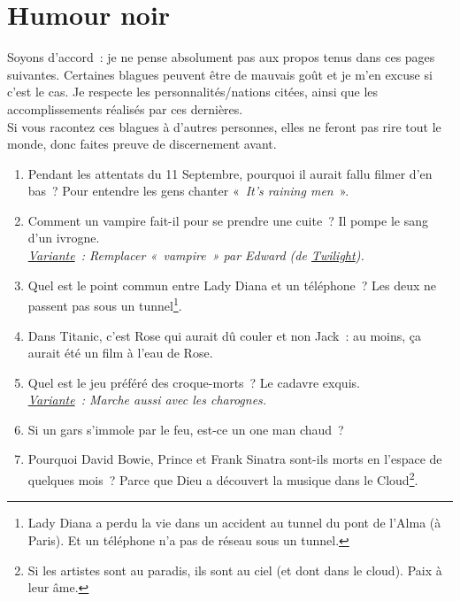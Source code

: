\documentclass[10pt,a5paper,fullpage]{book}
\begin{document}
\chapter{Humour noir}
Soyons d'accord~: je ne pense absolument pas aux propos tenus dans ces pages suivantes. Certaines blagues peuvent être de mauvais goût et je m'en excuse si c'est le cas. Je respecte les personnalités/nations citées, ainsi que les accomplissements réalisés par ces dernières. \\ 
Si vous racontez ces blagues à d'autres personnes, elles ne feront pas rire tout le monde, donc faites preuve de discernement avant. 
\newpage
\begin{enumerate}
	\item Pendant les attentats du 11 Septembre, pourquoi il aurait fallu filmer d’en bas~? Pour entendre les gens chanter «~\textit{It’s raining men}~».
	
	\item Comment un vampire fait-il pour se prendre une cuite~? Il pompe le sang d’un ivrogne. 
	\\\textit{\underline{Variante}~: Remplacer «~vampire~» par Edward (de \underline{Twilight}).}
	
	\item Quel est le point commun entre Lady Diana et un téléphone~? Les deux ne passent pas sous un tunnel\footnote{Lady Diana a perdu la vie dans un accident au tunnel du pont de l'Alma (à Paris). Et un téléphone n'a pas de réseau sous un tunnel.}.
	
	\item Dans Titanic, c’est Rose qui aurait dû couler et non Jack~: au moins, ça aurait été un film à l’eau de Rose.
	
	\item Quel est le jeu préféré des croque-morts~? Le cadavre exquis.
	\\\textit{\underline{Variante}~: Marche aussi avec les charognes.}
	
	\item Si un gars s’immole par le feu, est-ce un one man chaud~?
	
	
	\item Pourquoi David Bowie, Prince et Frank Sinatra sont-ils morts en l’espace de quelques mois~? Parce que Dieu a découvert la musique dans le Cloud\footnote{Si les artistes sont au paradis, ils sont au ciel (et dont dans le cloud). Paix à leur âme.}.
	

\end{enumerate}
\end{document}
